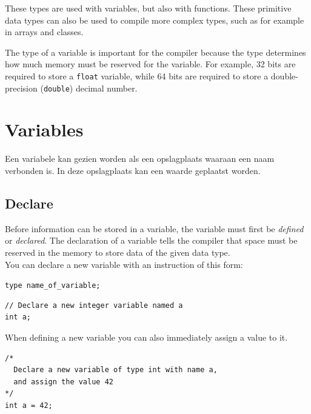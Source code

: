 \documentclass[11pt,fleqn]{book} %
\begin{document}


\noindent These types are used with variables, but also with functions. These primitive data types can also be used to compile more complex types, such as for example in arrays and classes.

\begin{remark}
    The type of a variable is important for the compiler because the type determines how much memory must be reserved for the variable. For example, 32 bits are required to store a \texttt{float} variable, while 64 bits are required to store a double-precision (\texttt{double}) decimal number.
\end{remark}

\section{Variables}
Een variabele kan gezien worden als een opslagplaats waaraan een naam verbonden is. In deze opslagplaats kan een waarde geplaatst worden.
\subsection{Declare}
Before information can be stored in a variable, the variable must first be \emph{defined} or \emph{declared}. The declaration of a variable tells the compiler that space must be reserved in the memory to store data of the given data type.\\

\noindent You can declare a new variable with an instruction of this form:

\begin{center}
	\texttt{type name\_of\_variable;}
\end{center}

\begin{example}
	\phantom{ }
	\begin{verbatim}
// Declare a new integer variable named a
int a;
	\end{verbatim}
\end{example}

\noindent When defining a new variable you can also immediately assign a value to it.

\begin{example}
	\phantom{ }
	\begin{verbatim}
/*
  Declare a new variable of type int with name a,
  and assign the value 42
*/
int a = 42;
	\end{verbatim}
\end{example}
\end{document}

